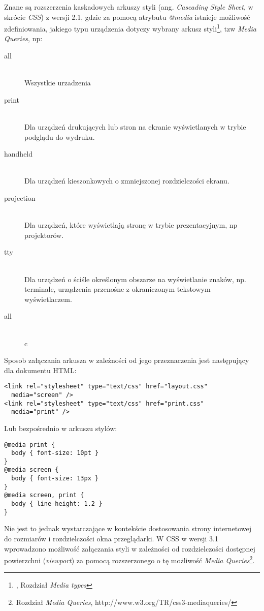 Znane są rozszerzenia kaskadowych arkuszy styli (ang. \emph{Cascading Style Sheet}, w skrócie \emph{CSS}) z wersji 2.1\cite{css21}, gdzie za pomocą atrybutu \emph{@media} istnieje możliwość zdefiniowania, jakiego typu urządzenia dotyczy wybrany arkusz styli\footnote{\cite{css21}, Rozdział \emph{Media types}}, tzw \emph{Media Queries}, np:

\begin{description}
  \item[all] \hfill \\
  Wszystkie urzadzenia
  \item[print] \hfill \\
  Dla urządzeń drukujących lub stron na ekranie wyświetlanych w trybie podglądu do wydruku.
  \item[handheld] \hfill \\
  Dla urządzeń kieszonkowych o zmniejszonej rozdzielczości ekranu.
  \item[projection] \hfill \\
  Dla urządzeń, które wyświetlają stronę w trybie prezentacyjnym, np projektorów.
  \item[tty] \hfill \\
  Dla urządzeń o ściśle określonym obszarze na wyświetlanie znaków, np. terminale, urządzenia przenośne z okraniczonym tekstowym wyświetlaczem.
  \item[all] \hfill \\
  c
\end{description}

Sposob załączania arkusza w zależności od jego przeznaczenia jest następujący dla dokumentu HTML:

\lstset{language=HTML}
\begin{lstlisting}
<link rel="stylesheet" type="text/css" href="layout.css"
  media="screen" />
<link rel="stylesheet" type="text/css" href="print.css"
  media="print" />
\end{lstlisting}

Lub bezpośrednio w arkuszu stylów:

\lstset{language=Octave}
\begin{lstlisting}
@media print {
  body { font-size: 10pt }
}
@media screen {
  body { font-size: 13px }
}
@media screen, print {
  body { line-height: 1.2 }
}
\end{lstlisting}

Nie jest to jednak wystarczające w kontekście dostosowania strony internetowej do rozmiarów i rozdzielczości okna przeglądarki. W CSS w wersji 3.1 wprowadzono możliwość załączania styli w zależności od rozdzielczości dostępnej powierzchni (\emph{viewport}) za pomocą rozszerzonego o tę możliwość \emph{Media Queries}\cite{css3}\footnote{\cite{css3} Rozdział \emph{Media Queries}, http://www.w3.org/TR/css3-mediaqueries/}.

